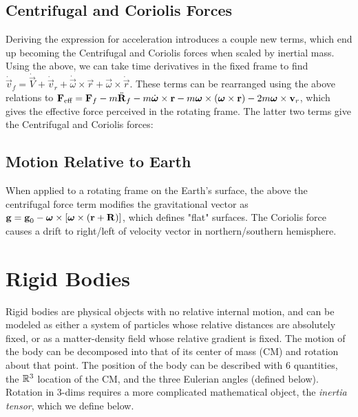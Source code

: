 \subsection{Centrifugal and Coriolis Forces}
Deriving the expression for acceleration introduces a couple new terms, which end up becoming the Centrifugal and Coriolis forces when scaled by inertial mass.  Using the above, we can take time derivatives in the fixed frame to find $\dot{\vec{v}}_f = \dot{\vec{V}} + \dot{\vec{v}}_r + \dot{\vec{\omega}}\times\vec{r} + \vec{\omega}\times\dot{\vec{r}}$. These terms can be rearranged using the above relations to $\boldsymbol{\mathbf{F}}_{\text{eff}} = \boldsymbol{\mathbf{F}}_f - m\ddot{\boldsymbol{\mathbf{R}}}_f - m\dot{\boldsymbol{\mathbf{\omega}}}\times\boldsymbol{\mathbf{r}} - m\boldsymbol{\mathbf{\omega}}\times\left(\boldsymbol{\mathbf{\omega}}\times\boldsymbol{\mathbf{r}}\right) - 2m\boldsymbol{\mathbf{\omega}}\times\boldsymbol{\mathbf{v}}_r$, which gives the effective force perceived in the rotating frame. The latter two terms give the Centrifugal and Coriolis forces:
\subsection{Motion Relative to Earth}
When applied to a rotating frame on the Earth's surface, the above the centrifugal force term modifies the gravitational vector as $\boldsymbol{\mathbf{g}} = \boldsymbol{\mathbf{g}}_0 - \boldsymbol{\mathbf{\omega}}\times\left[\boldsymbol{\mathbf{\omega}}\times\left(\boldsymbol{\mathbf{r}}+\boldsymbol{\mathbf{R}}\right)\right]$, which defines "flat" surfaces. The Coriolis force causes a drift to right/left of velocity vector in northern/southern hemisphere.



\newpage
\section{Rigid Bodies}
\label{sec:cm-rigid}
Rigid bodies are physical objects with no relative internal motion, and can be modeled as either a system of particles whose relative distances are absolutely fixed, or as a matter-density field whose relative gradient is fixed. The motion of the body can be decomposed into that of its center of mass (CM) and rotation about that point. The position of the body can be described with 6 quantities, the $\mathbb{R}^{3}$ location of the CM, and the three Eulerian angles (defined below). Rotation in 3-dims requires a more complicated mathematical object, the \textit{inertia tensor}, which we define below.
